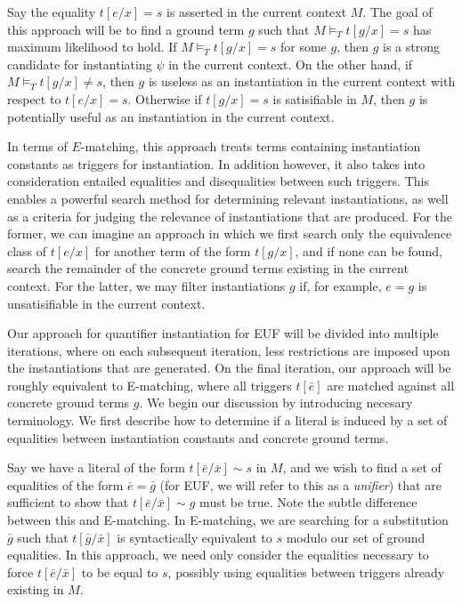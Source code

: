 \documentclass{llncs}
\begin{document}
Say the equality $t[e/x] = s$ is asserted in the current context $M$.
The goal of this approach will be to find a ground term $g$ such that $M \models_T t[g/x] = s$ has maximum likelihood to hold.
If $M \models_T t[g/x] = s$ for some $g$, then $g$ is a strong candidate for instantiating $\psi$ in the current context.
On the other hand, if $M \models_T t[g/x] \neq s$, then $g$ is useless as an instantiation in the current context with respect to $t[e/x] = s$.
Otherwise if $t[g/x] = s$ is satisifiable in $M$, then $g$ is potentially useful as an instantiation in the current context.

In terms of $E$-matching, this approach treats terms containing instantiation constants as triggers for instantiation.
In addition however, it also takes into consideration entailed equalities and disequalities between such triggers.
This enables a powerful search method for determining relevant instantiations, as well as a criteria for judging the relevance of instantiations that are produced.
For the former, we can imagine an approach in which we first search only the equivalence class of $t[e/x]$ for another term of the form $t[g/x]$, and if none can be found, search the remainder of the concrete ground terms existing in the current context.
For the latter, we may filter instantiations $g$ if, for example, $e = g$ is unsatisifiable in the current context.

Our approach for quantifier instantiation for EUF will be divided into multiple iterations, where on each subsequent iteration, less restrictions are imposed upon the instantiations that are generated.
On the final iteration, our approach will be roughly equivalent to E-matching, where all triggers $t[\bar{e}]$ are matched against all concrete ground terms $g$.
We begin our discussion by introducing necesary terminology.
We first describe how to determine if a literal is induced by a set of equalities between instantiation constants and concrete ground terms.

Say we have a literal of the form $t[\bar{e}/\bar{x}] \sim s$ in $M$, and we wish to find a set of equalities of the form $\bar{e} = \bar{g}$ (for EUF, we will refer to this as a \emph{unifier}) that are sufficient to show that $t[\bar{e}/\bar{x}] \sim g$ must be true.
Note the subtle difference between this and E-matching.
In E-matching, we are searching for a substitution $\bar{g}$ such that $t[\bar{g}/\bar{x}]$ is syntactically equivalent to $s$ modulo our set of ground equalities.
In this approach, we need only consider the equalities necessary to force $t[\bar{e}/\bar{x}]$ to be equal to $s$, possibly using equalities between triggers already existing in $M$.
\end{document}
